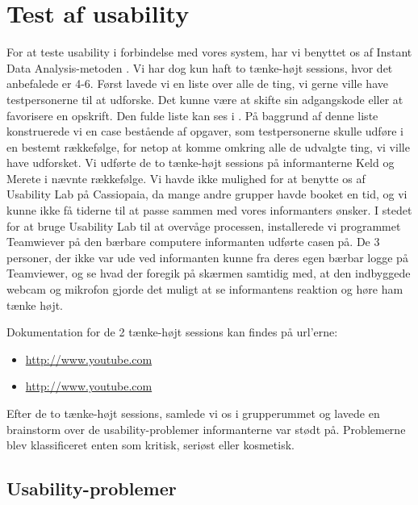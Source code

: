\section{Test af usability}
\label{sec:usability}

For at teste usability i forbindelse med vores system, har vi benyttet os af Instant Data Analysis-metoden \cite{debida}. Vi har dog kun haft to tænke-højt sessions, hvor det anbefalede er 4-6. Først lavede vi en liste over alle de ting, vi gerne ville have testpersonerne til at udforske. Det kunne \fx være at skifte sin adgangskode eller at favorisere en opskrift. Den fulde liste kan ses i . På baggrund af denne liste konstruerede vi en case bestående af opgaver, som testpersonerne skulle udføre i en bestemt rækkefølge, for netop at komme omkring alle de udvalgte ting, vi ville have udforsket. Vi udførte de to tænke-højt sessions på informanterne Keld og Merete i nævnte rækkefølge. Vi havde ikke mulighed for at benytte os af Usability Lab på Cassiopaia, da mange andre grupper havde booket en tid, og vi kunne ikke få tiderne til at passe sammen med vores informanters ønsker. I stedet for at bruge Usability Lab til at overvåge processen, installerede vi programmet Teamwiever på den bærbare computere informanten udførte casen på. De 3 personer, der ikke var ude ved informanten kunne fra deres egen bærbar logge på Teamviewer, og se hvad der foregik på skærmen samtidig med, at den indbyggede webcam og mikrofon gjorde det muligt at se informantens reaktion og høre ham tænke højt.

Dokumentation for de 2 tænke-højt sessions kan findes på url'erne:
\begin{itemize}[noitemsep]
\item \url{http://www.youtube.com}
\item \url{http://www.youtube.com}
\end{itemize}

Efter de to tænke-højt sessions, samlede vi os i grupperummet og lavede en brainstorm over de usability-problemer informanterne var stødt på. Problemerne blev klassificeret enten som kritisk, seriøst eller kosmetisk.

\subsection{Usability-problemer}

